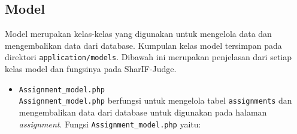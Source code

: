 \subsection{Model}
\label{sub:3:1:model}
Model merupakan kelas-kelas yang digunakan untuk mengelola data dan mengembalikan data dari database. Kumpulan kelas model tersimpan pada direktori \texttt{application/models}. Dibawah ini merupakan penjelasan dari setiap kelas model dan fungsinya pada SharIF-Judge.
\begin{itemize}
	\item \verb|Assignment_model.php| \\
	      \verb|Assignment_model.php| berfungsi untuk mengelola tabel \verb|assignments| dan mengembalikan data dari database untuk digunakan pada halaman \textit{assignment}. Fungsi \verb|Assignment_model.php| yaitu:


\end{itemize}
